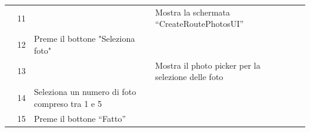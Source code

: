 \documentclass{natourDoc}
\begin{document}
\begin{tabularx}{\linewidth}{| l | p{1cm} | p{4cm} | X | X|}
	\cline{2-5}                   & 11                                                                                                                                     &                                                                                                                                                                      & Mostra la schermata “CreateRoutePhotosUI”           &                                                                                       \\

	\cline{2-5}                   & 12                                                                                                                                     & Preme il bottone "Seleziona foto"                                                                                                                                   &                                                     &                                                                                       \\

	\cline{2-5}                   & 13                                                                                                                                     &                                                                                                                                                                      & Mostra il photo picker per la selezione delle foto  &                                                                                       \\

	\cline{2-5}                   & 14                                                                                                                                     & Seleziona un numero di foto compreso tra 1 e 5                                                                                                                       &                                                     &                                                                                       \\

	\cline{2-5}                   & 15                                                                                                                                     & Preme il bottone “Fatto”                                                                                                                                             &                                                     &                                                                                       \\


\end{tabularx}
\end{document}
